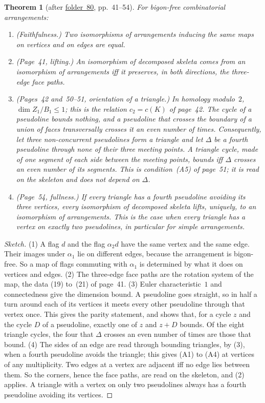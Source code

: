 \documentclass[11pt,a4paper]{amsart}
\newtheorem{theorem}{Theorem}[section]
\theoremstyle{definition}
\theoremstyle{remark}
\newcommand{\fac}[1]{\href{https://grothendieck.umontpellier.fr/#1.pdf}{folder~#1}}
\begin{document}
\begin{theorem}[after \fac{80}, pp.~41--54]\label{thm:skeleton}
For bigon-free combinatorial arrangements:
\begin{enumerate}
\item \emph{(Faithfulness.)} Two isomorphisms of arrangements inducing the same maps on vertices and on edges are equal.
\item \emph{(Page~41, lifting.)} An isomorphism of decomposed skeleta comes from an isomorphism of arrangements iff it preserves, in both directions, the three-edge face paths.
\item \emph{(Pages~42 and~50--51, orientation of a triangle.)} In homology modulo~$2$, $\dim Z_1/B_1 \le 1$; this is the relation $c_2 = c(K)$ of page~42. The cycle of a pseudoline bounds nothing, and a pseudoline that crosses the boundary of a union of faces transversally crosses it an even number of times. Consequently, let three non-concurrent pseudolines form a triangle and let $\Delta$ be a fourth pseudoline through none of their three meeting points. A triangle cycle, made of one segment of each side between the meeting points, bounds iff $\Delta$ crosses an even number of its segments. This is condition~(A5) of page~51; it is read on the skeleton and does not depend on $\Delta$.
\item \emph{(Page~54, fullness.)} If every triangle has a fourth pseudoline avoiding its three vertices, every isomorphism of decomposed skeleta lifts, uniquely, to an isomorphism of arrangements. This is the case when every triangle has a vertex on exactly two pseudolines, in particular for simple arrangements.
\end{enumerate}
\end{theorem}

\begin{proof}[Sketch]
(1) A flag $d$ and the flag $\alpha_2 d$ have the same vertex and the same edge. Their images under $\alpha_1$ lie on different edges, because the arrangement is bigon-free. So a map of flags commuting with $\alpha_1$ is determined by what it does on vertices and edges. (2) The three-edge face paths are the rotation system of the map, the data (19) to~(21) of page~41. (3) Euler characteristic~$1$ and connectedness give the dimension bound. A pseudoline goes straight, so in half a turn around each of its vertices it meets every other pseudoline through that vertex once. This gives the parity statement, and shows that, for a cycle $z$ and the cycle $D$ of a pseudoline, exactly one of $z$ and $z + D$ bounds. Of the eight triangle cycles, the four that $\Delta$ crosses an even number of times are those that bound. (4) The sides of an edge are read through bounding triangles, by (3), when a fourth pseudoline avoids the triangle; this gives (A1) to (A4) at vertices of any multiplicity. Two edges at a vertex are adjacent iff no edge lies between them. So the corners, hence the face paths, are read on the skeleton, and (2) applies. A triangle with a vertex on only two pseudolines always has a fourth pseudoline avoiding its vertices.
\end{proof}
\end{document}
